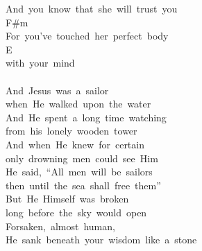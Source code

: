 \documentclass[]{book}
\begin{document}
And~you~know~that~she~will~trust~you\\
\hspace*{0.333em}\hspace*{0.333em}\hspace*{0.333em}\hspace*{0.333em}\hspace*{0.333em}\hspace*{0.333em}\hspace*{0.333em}\hspace*{0.333em}\hspace*{0.333em}\hspace*{0.333em}\hspace*{0.333em}\hspace*{0.333em}\hspace*{0.333em}F\#m~~~~~~~~\\
For~you've~touched~her~perfect~body~~~~~~~~~~~~~~~~~\\
\hspace*{0.333em}\hspace*{0.333em}\hspace*{0.333em}\hspace*{0.333em}\hspace*{0.333em}\hspace*{0.333em}\hspace*{0.333em}\hspace*{0.333em}\hspace*{0.333em}\hspace*{0.333em}\hspace*{0.333em}E\\
with~your~mind\\
~\\
And~Jesus~was~a~sailor\\
when~He~walked~upon~the~water\\
And~He~spent~a~long~time~watching\\
from~his~lonely~wooden~tower\\
And~when~He~knew~for~certain\\
only~drowning~men~could~see~Him\\
He~said,~``All~men~will~be~sailors\\
then~until~the~sea~shall~free~them''\\
But~He~Himself~was~broken\\
long~before~the~sky~would~open\\
Forsaken,~almost~human,~\\
He~sank~beneath~your~wisdom~like~a~stone\\
\end{document}
